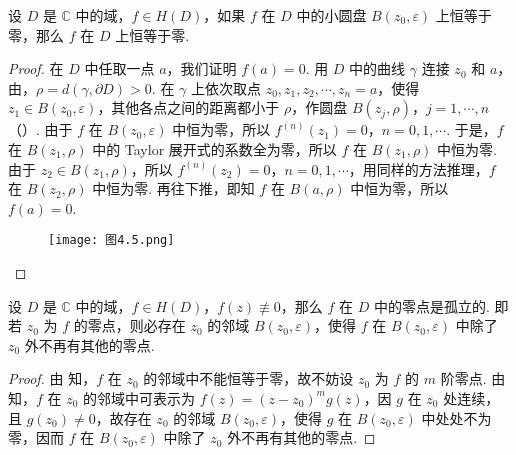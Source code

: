 \documentclass[../../main.tex]{subfiles}
\begin{document}
\begin{proposition}\label{proposition:命题4.3.5}
设 \( D \) 是 \( \mathbb{C} \) 中的域，\( f \in H(D) \)，如果 \( f \) 在 \( D \) 中的小圆盘 \( B(z_0, \varepsilon) \) 上恒等于零，那么 \( f \) 在 \( D \) 上恒等于零.
\end{proposition}
\begin{proof}
在 \( D \) 中任取一点 \( a \)，我们证明 \( f(a) = 0 \). 用 \( D \) 中的曲线 \( \gamma \) 连接 \( z_0 \) 和 \( a \)，由，\( \rho = d(\gamma, \partial D) > 0 \). 在 \( \gamma \) 上依次取点 \( z_0, z_1, z_2, \cdots, z_n = a \)，使得 \( z_1 \in B(z_0, \varepsilon) \)，其他各点之间的距离都小于 \( \rho \)，作圆盘 \( B(z_j, \rho) \)，\( j = 1, \cdots, n \)（）. 由于 \( f \) 在 \( B(z_0, \varepsilon) \) 中恒为零，所以 \( f^{(n)}(z_1) = 0 \)，\( n = 0, 1, \cdots \). 于是，\( f \) 在 \( B(z_1, \rho) \) 中的 Taylor 展开式的系数全为零，所以 \( f \) 在 \( B(z_1, \rho) \) 中恒为零. 由于 \( z_2 \in B(z_1, \rho) \)，所以 \( f^{(n)}(z_2) = 0 \)，\( n = 0, 1, \cdots \)，用同样的方法推理，\( f \) 在 \( B(z_2, \rho) \) 中恒为零. 再往下推，即知 \( f \) 在 \( B(a, \rho) \) 中恒为零，所以 \( f(a) = 0 \).
\begin{figure}[H]
\centering
\texttt{[image: 图4.5.png]}
\caption{}
\label{figure:图4.5}
\end{figure}
\end{proof}

\begin{proposition}\label{proposition:命题4.3.6}
设 \( D \) 是 \( \mathbb{C} \) 中的域，\( f \in H(D) \)，\( f(z) \not\equiv 0 \)，那么 \( f \) 在 \( D \) 中的零点是孤立的. 即若 \( z_0 \) 为 \( f \) 的零点，则必存在 \( z_0 \) 的邻域 \( B(z_0, \varepsilon) \)，使得 \( f \) 在 \( B(z_0, \varepsilon) \) 中除了 \( z_0 \) 外不再有其他的零点.
\end{proposition}
\begin{proof}
由 知，\( f \) 在 \( z_0 \) 的邻域中不能恒等于零，故不妨设 \( z_0 \) 为 \( f \) 的 \( m \) 阶零点. 由知，\( f \) 在 \( z_0 \) 的邻域中可表示为 \( f(z) = (z - z_0)^m g(z) \)，因 \( g \) 在 \( z_0 \) 处连续，且 \( g(z_0) \neq 0 \)，故存在 \( z_0 \) 的邻域 \( B(z_0, \varepsilon) \)，使得 \( g \) 在 \( B(z_0, \varepsilon) \) 中处处不为零，因而 \( f \) 在 \( B(z_0, \varepsilon) \) 中除了 \( z_0 \) 外不再有其他的零点.
\end{proof} 
\end{document}
